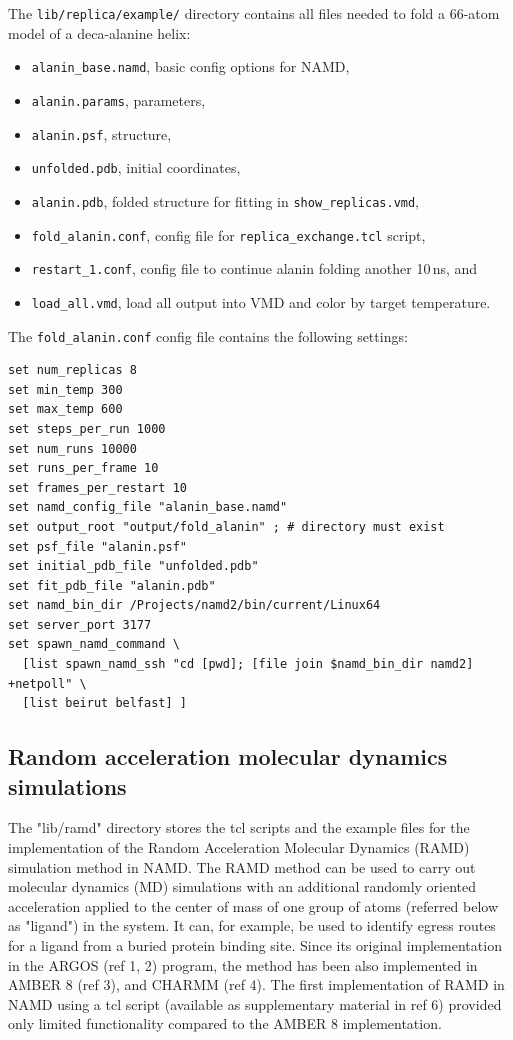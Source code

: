 The {\tt lib/replica/example/} directory contains
all files needed to fold a 66-atom model of a deca-alanine helix:
\begin{itemize}
\item {\tt alanin\_base.namd}, basic config options for NAMD,
\item {\tt alanin.params}, parameters,
\item {\tt alanin.psf}, structure,
\item {\tt unfolded.pdb}, initial coordinates,
\item {\tt alanin.pdb}, folded structure for fitting in {\tt show\_replicas.vmd},
\item {\tt fold\_alanin.conf}, config file for {\tt replica\_exchange.tcl} script,
\item {\tt restart\_1.conf}, config file to continue alanin folding another 10\,ns, and
\item {\tt load\_all.vmd}, load all output into VMD and color by target temperature.
\end{itemize}

The {\tt fold\_alanin.conf} config file contains the following settings:
\begin{verbatim}
set num_replicas 8
set min_temp 300
set max_temp 600
set steps_per_run 1000
set num_runs 10000
set runs_per_frame 10
set frames_per_restart 10
set namd_config_file "alanin_base.namd"
set output_root "output/fold_alanin" ; # directory must exist
set psf_file "alanin.psf"
set initial_pdb_file "unfolded.pdb"
set fit_pdb_file "alanin.pdb"
set namd_bin_dir /Projects/namd2/bin/current/Linux64
set server_port 3177
set spawn_namd_command \
  [list spawn_namd_ssh "cd [pwd]; [file join $namd_bin_dir namd2] +netpoll" \
  [list beirut belfast] ]
\end{verbatim}

\subsection{Random acceleration molecular dynamics simulations}

The "lib/ramd" directory stores the tcl scripts and the example files for the implementation of the Random Acceleration Molecular Dynamics (RAMD) simulation method in NAMD. 
The RAMD method can be used to carry out molecular dynamics (MD) simulations with an additional randomly oriented acceleration applied to the center of mass of one group of atoms (referred below as "ligand") in the system. 
It can, for example, be used to identify egress routes for a ligand from a buried protein binding site. 
Since its original implementation in the ARGOS (ref 1, 2) program, the method has been also implemented in AMBER 8 (ref 3), and CHARMM (ref 4). 
The first implementation of RAMD in NAMD using a tcl script (available as supplementary material in ref 6) provided only limited functionality compared to the AMBER 8 implementation. 

